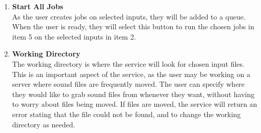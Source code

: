 \begin{enumerate}
    \item \textbf{Start All Jobs}\\ As the user creates jobs on selected inputs, they will be added to a queue. When the user is ready, they will select this button to run the chosen jobs in item 5 on the selected inputs in item 2.
    \item \textbf{Working Directory}\\ The working directory is where the service will look for chosen input files. This is an important aspect of the service, as the user may be working on a server where sound files are frequently moved. The user can specify where they would like to grab sound files from whenever they want, without having to worry about files being moved. If files are moved, the service will return an error stating that the file could not be found, and to change the working directory as needed.
\end{enumerate}
